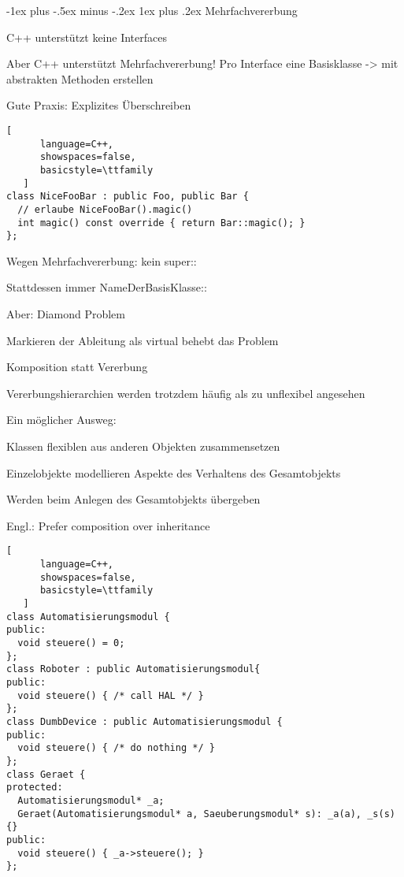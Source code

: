 \documentclass[10pt]{article}
\makeatletter
\renewcommand{\subsubsection}{\@startsection{subsubsection}{3}{0mm}%
                                {-1ex plus -.5ex minus -.2ex}%
                                {1ex plus .2ex}%
                                {\normalfont\small\bfseries}}
\makeatother
\begin{document}
\subsubsection{Mehrfachvererbung}
\begin{itemize*}
  \item C++ unterstützt keine Interfaces
  \item Aber C++ unterstützt Mehrfachvererbung! Pro Interface eine Basisklasse -> mit abstrakten Methoden erstellen
  \item Gute Praxis: Explizites Überschreiben
  \begin{lstlisting}[
      language=C++,
      showspaces=false,
      basicstyle=\ttfamily
   ]
class NiceFooBar : public Foo, public Bar {
  // erlaube NiceFooBar().magic()
  int magic() const override { return Bar::magic(); }
};
\end{lstlisting}
  
  \begin{itemize*}
    \item Wegen Mehrfachvererbung: kein super::
    \item Stattdessen immer NameDerBasisKlasse::
  \end{itemize*}
  \item Aber: Diamond Problem
  \begin{itemize*}
    \item Markieren der Ableitung als virtual behebt das Problem
  \end{itemize*}
\end{itemize*}

Komposition statt Vererbung
\begin{itemize*}
  \item Vererbungshierarchien werden trotzdem häufig als zu unflexibel angesehen
  \item Ein möglicher Ausweg:
  \begin{itemize*}
    \item Klassen flexiblen aus anderen Objekten zusammensetzen
    \item Einzelobjekte modellieren Aspekte des Verhaltens des Gesamtobjekts
    \item Werden beim Anlegen des Gesamtobjekts übergeben
  \end{itemize*}
  \item Engl.: Prefer composition over inheritance
\end{itemize*}

\begin{lstlisting}[
      language=C++,
      showspaces=false,
      basicstyle=\ttfamily
   ]
class Automatisierungsmodul {
public:
  void steuere() = 0;
};
class Roboter : public Automatisierungsmodul{
public:
  void steuere() { /* call HAL */ }
};
class DumbDevice : public Automatisierungsmodul {
public:
  void steuere() { /* do nothing */ }
};
class Geraet {
protected:
  Automatisierungsmodul* _a;
  Geraet(Automatisierungsmodul* a, Saeuberungsmodul* s): _a(a), _s(s) {}
public:
  void steuere() { _a->steuere(); }
};
\end{lstlisting}
\end{document}
